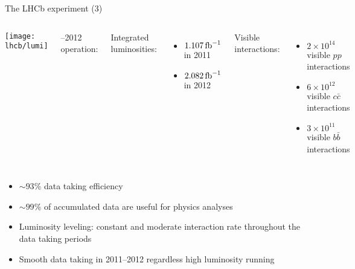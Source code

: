 \begin{frame}[t]{The LHCb experiment (3)}

\begin{columns}[t]

\texttt{[image: lhcb/lumi]}

\begin{minipage}[c][.55\textheight][t]{\linewidth}
--2012 operation:

\bigskip
Integrated luminosities:

\begin{itemize}
\item $1.107\mbox{\,fb}^{-1}$ in 2011
\item $2.082\mbox{\,fb}^{-1}$ in 2012
\end{itemize}

Visible  interactions:
\begin{itemize}
\item $2\times10^{14}$ visible $pp$ interactions 
\item $6\times10^{12}$ visible $c\bar{c}$ interactions 
\item $3\times10^{11}$ visible $b\bar{b}$ interactions 
\end{itemize}
\end{minipage}
\end{columns}

\begin{itemize}
\item ${\sim}93\%$ data taking efficiency
\item ${\sim}99\%$ of accumulated data are useful for physics analyses
\item Luminosity leveling: constant and moderate interaction rate throughout the data taking periods
\item Smooth data taking in 2011--2012 regardless high luminosity running 
\end{itemize}

\end{frame}
